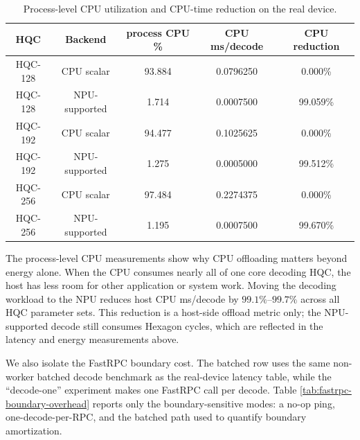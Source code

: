 \begin{table}[htbp]
\centering
\renewcommand{\arraystretch}{1.15}
\small
\begin{tabular}{|c|c|c|c|c|}
\hline
\textbf{HQC} & \textbf{Backend} & \textbf{process CPU \%} &
\textbf{CPU ms/decode} & \textbf{CPU reduction} \\
\hline
HQC-128 & CPU scalar    & 93.884 & 0.0796250 & 0.000\% \\
\hline
HQC-128 & NPU-supported & 1.714  & 0.0007500 & 99.059\% \\
\hline
HQC-192 & CPU scalar    & 94.477 & 0.1025625 & 0.000\% \\
\hline
HQC-192 & NPU-supported & 1.275  & 0.0005000 & 99.512\% \\
\hline
HQC-256 & CPU scalar    & 97.484 & 0.2274375 & 0.000\% \\
\hline
HQC-256 & NPU-supported & 1.195  & 0.0007500 & 99.670\% \\
\hline
\end{tabular}
\vspace{0.5em}
\caption{Process-level CPU utilization and CPU-time reduction on the real device.}
\label{tab:real-device-cpu-offload}

\end{table}

The process-level CPU measurements show why CPU offloading matters beyond energy
alone. When the CPU consumes nearly all of one core decoding HQC, the host has
less room for other application or system work. Moving the decoding workload to
the NPU reduces host CPU ms/decode by \(99.1\%\)--\(99.7\%\) across all HQC
parameter sets. This reduction is a host-side offload metric only; the
NPU-supported decode still consumes Hexagon cycles, which are reflected in the
latency and energy measurements above.

We also isolate the FastRPC boundary cost. The batched row uses the same
non-worker batched decode benchmark as the real-device latency table, while the
``decode-one'' experiment makes one FastRPC call per decode. Table
\ref{tab:fastrpc-boundary-overhead} reports only the boundary-sensitive modes:
a no-op ping, one-decode-per-RPC, and the batched path used to
quantify boundary amortization.

